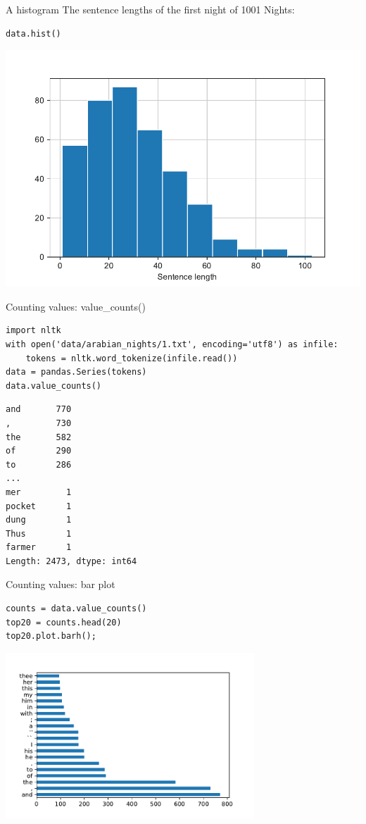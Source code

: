 \documentclass[aspectratio=169,usenames,dvipsnames]{beamer}
\begin{document}
\begin{frame}[fragile]{A histogram}
The sentence lengths of the first night of 1001 Nights:
\begin{lstlisting}
data.hist()
\end{lstlisting}
\includegraphics[height=0.7\textheight]{fig/basichist}
\end{frame}


\begin{frame}[fragile]{Counting values: value\_counts()}
\begin{lstlisting}
import nltk
with open('data/arabian_nights/1.txt', encoding='utf8') as infile:
    tokens = nltk.word_tokenize(infile.read())
data = pandas.Series(tokens)
data.value_counts()
\end{lstlisting}
\begin{lstlisting}[style=plain]
and       770
,         730
the       582
of        290
to        286
... 
mer         1
pocket      1
dung        1
Thus        1
farmer      1
Length: 2473, dtype: int64
\end{lstlisting}
\end{frame}

\begin{frame}[fragile]{Counting values: bar plot}
\begin{lstlisting}
counts = data.value_counts()
top20 = counts.head(20)
top20.plot.barh();
\end{lstlisting}
\includegraphics[width=0.7\textwidth]{fig/barplotwords}
\end{frame}
\end{document}
